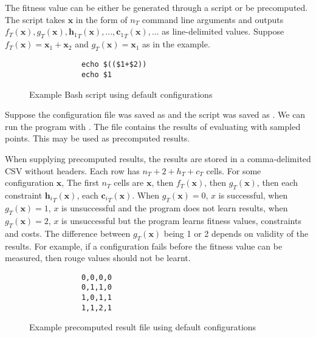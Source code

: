 \documentclass[10pt,a4paper]{article}
\begin{document}
The fitness value can be either be generated through a script or be precomputed. The script takes $\mathbf{x}$ in the form of $n_T$ command line arguments and outputs $f_T(\mathbf{x}),g_T(\mathbf{x}),{\mathbf{h}_1}_T(\mathbf{x}),...,{\mathbf{c}_1}_T(\mathbf{x}),...$ as line-delimited values. Suppose $f_T(\mathbf{x})=\mathbf{x}_1+\mathbf{x}_2$ and $g_T(\mathbf{x})=\mathbf{x}_1$ as in the example.

\begin{figure}[H]
	\begin{framed}
		\begin{verbatim}
			echo $(($1+$2))
			echo $1
		\end{verbatim}
	\end{framed}
	\caption{Example Bash script using default configurations}
\end{figure}

Suppose the configuration file was saved as  and the script was saved as . We can run the program with . The file  contains the results of evaluating  with sampled points. This may be used as precomputed results.

When supplying precomputed results, the results are stored in a comma-delimited CSV without headers. Each row has $n_T+2+h_T+c_T$ cells. For some configuration $\mathbf{x}$, The first $n_T$ cells are $\mathbf{x}$, then $f_T(\mathbf{x})$, then $g_T(\mathbf{x})$, then each constraint ${\mathbf{h}_i}_T(\mathbf{x})$, each ${\mathbf{c}_i}_T(\mathbf{x})$. When $g_T(\mathbf{x})=0$, $x$ is successful, when $g_T(\mathbf{x})=1$, $x$ is unsuccessful and the program does not learn results, when $g_T(\mathbf{x})=2$, $x$ is unsuccessful but the program learns fitness values, constraints and costs. The difference between $g_T(\mathbf{x})$ being 1 or 2 depends on validity of the results. For example, if a configuration fails before the fitness value can be measured, then rouge values should not be learnt.

\begin{figure}[H]
	\begin{framed}
		\begin{verbatim}
			0,0,0,0
			0,1,1,0
			1,0,1,1
			1,1,2,1
		\end{verbatim}
	\end{framed}
	\caption{Example precomputed result file using default configurations}
\end{figure}
\end{document}

